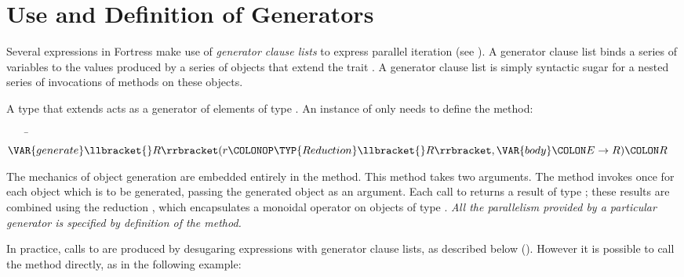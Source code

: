 %
%
%
%

\section{Use and Definition of Generators}

Several expressions in Fortress make use of \emph{generator clause
  lists} to express parallel iteration (see ).  A
generator clause list binds a series of variables to the values produced by a
series of objects that extend the trait .  A generator clause
list is simply syntactic sugar for a nested series of invocations of
methods on these objects.

A type that extends  acts
as a generator of elements of type .  An instance of
 only needs to define the
 method:
\begin{Fortress}
{\tt~~~~}\pushtabs\=\+\(    \VAR{generate}\llbracket{}R\rrbracket(r\COLONOP\TYP{Reduction}\llbracket{}R\rrbracket, \VAR{body}\COLON E\rightarrow{}R)\COLON R\)\-\\\poptabs
\end{Fortress}
The mechanics of object generation are embedded entirely in the
 method.  This method takes two arguments.  The  method invokes  once for each
object which is to be generated, passing the generated object as an
argument.  Each call to  returns a result of type ; these results are combined using the reduction , which encapsulates a monoidal operator on objects of type .    \emph{All the parallelism provided by a
  particular generator is specified by definition of the  method.}

In practice, calls to  are produced by desugaring
expressions with generator clause lists, as described below
().  However it is possible to call the
 method directly, as in the following example:


